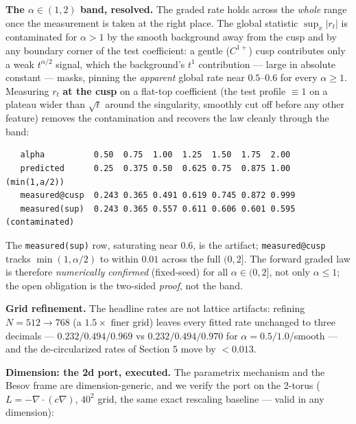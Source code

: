 \documentclass[11pt]{article}
\begin{document}
\textbf{The $\alpha \in (1, 2)$ band, resolved.}  The graded rate holds across the \emph{whole} range once the measurement is taken at the right place.  The global statistic $\sup_x|r_t|$ is contaminated for $\alpha > 1$ by the smooth background away from the cusp and by any boundary corner of the test coefficient: a gentle ($C^{1+}$) cusp contributes only a weak $t^{\alpha/2}$ signal, which the background's $t^1$ contribution — large in absolute constant — masks, pinning the \emph{apparent} global rate near $0.5$–$0.6$ for every $\alpha \ge 1$. Measuring $r_t$ \textbf{at the cusp} on a flat-top coefficient (the test profile $\equiv 1$ on a plateau wider than $\sqrt t$ around the singularity, smoothly cut off before any other feature) removes the contamination and recovers the law cleanly through the band:

\begin{small}\begin{verbatim}
   alpha          0.50  0.75  1.00  1.25  1.50  1.75  2.00
   predicted      0.25  0.375 0.50  0.625 0.75  0.875 1.00   (min(1,a/2))
   measured@cusp  0.243 0.365 0.491 0.619 0.745 0.872 0.999
   measured(sup)  0.243 0.365 0.557 0.611 0.606 0.601 0.595   (contaminated)
\end{verbatim}\end{small}
The \texttt{measured(sup)} row, saturating near $0.6$, is the artifact; \texttt{measured@cusp} tracks $\min(1,\alpha/2)$ to within $0.01$ across the full $(0,2]$.  The forward graded law is therefore \emph{numerically confirmed} (fixed-seed) for all $\alpha \in (0,2]$, not only $\alpha \le 1$; the open obligation is the two-sided \emph{proof}, not the band.

\textbf{Grid refinement.}  The headline rates are not lattice artifacts: refining $N = 512 \to 768$ (a $1.5\times$ finer grid) leaves every fitted rate unchanged to three decimals — $0.232/0.494/0.969$ vs $0.232/0.494/0.970$ for $\alpha = 0.5/1.0$/smooth — and the de-circularized rates of Section 5 move by $< 0.013$.

\textbf{Dimension: the 2d port, executed.}  The parametrix mechanism and the Besov frame are dimension-generic, and we verify the port on the 2-torus ($L = -\nabla\!\cdot(c\nabla)$, $40^2$ grid, the same exact rescaling baseline — valid in any dimension):
\end{document}
